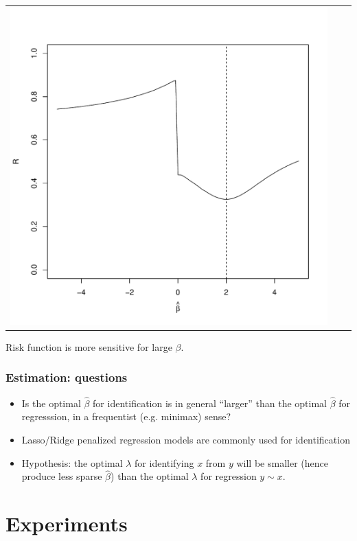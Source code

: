 \documentclass{beamer}
\begin{document}
\begin{frame}
\begin{center}
\begin{tabular}{ccc}
\includegraphics[scale = .2]{risk_2.pdf} 
\end{tabular}
\end{center}
Risk function is more sensitive for large $\beta$.
\end{frame}

\begin{frame}
\frametitle{Estimation: questions}
\begin{itemize}
\item Is the optimal $\hat{\beta}$ for identification is
  in general ``larger'' than the optimal $\hat{\beta}$ for
  regresssion, in a frequentist (e.g. minimax) sense?
\item Lasso/Ridge penalized regression models are commonly used for
  identification
\item Hypothesis: the optimal $\lambda$ for identifying $x$ from $y$
  will be smaller (hence produce less sparse $\hat{\beta}$) than the
  optimal $\lambda$ for regression $y \sim x$.
\end{itemize}
\end{frame}

\section{Experiments}
\frame{\sectionpage}
\end{document}
